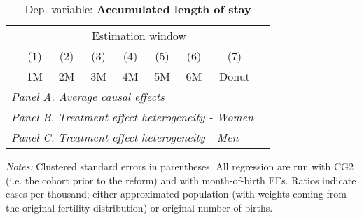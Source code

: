  \begin{table}[H] \begin{threeparttable} \centering \caption{Dep. variable: \textbf{Accumulated length of stay}} {\def\sym#1{\ifmmode^{#1}\else\(^{#1}\)\fi} \begin{tabular}{l*{8}{c}} \toprule & \multicolumn{7}{c}{Estimation window} \\ \cmidrule(lr){2-8}
            &\multicolumn{1}{c}{(1)}&\multicolumn{1}{c}{(2)}&\multicolumn{1}{c}{(3)}&\multicolumn{1}{c}{(4)}&\multicolumn{1}{c}{(5)}&\multicolumn{1}{c}{(6)}&\multicolumn{1}{c}{(7)}\\
            &\multicolumn{1}{c}{1M}&\multicolumn{1}{c}{2M}&\multicolumn{1}{c}{3M}&\multicolumn{1}{c}{4M}&\multicolumn{1}{c}{5M}&\multicolumn{1}{c}{6M}&\multicolumn{1}{c}{Donut}\\
\midrule
 \multicolumn{8}{l}{\emph{Panel A. Average causal effects}} \\       \midrule\multicolumn{8}{l}{\emph{Panel B. Treatment effect heterogeneity - Women}} \\       \midrule\multicolumn{8}{l}{\emph{Panel C. Treatment effect heterogeneity - Men}} \\       
\bottomrule \end{tabular} } \begin{tablenotes} \item \scriptsize \emph{Notes:} Clustered standard errors in parentheses. All regression are run with CG2 (i.e. the cohort prior to the reform) and with month-of-birth FEs. Ratios indicate cases per thousand; either approximated population (with weights coming from the original fertility distribution) or original number of births. \end{tablenotes} \end{threeparttable} \end{table} 

